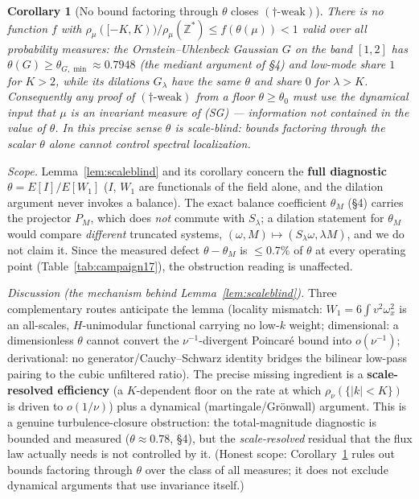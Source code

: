 \documentclass[11pt]{article}
\newtheorem{corollary}[theorem]{Corollary}
\theoremstyle{remark}
\theoremstyle{plain}
\begin{document}
\begin{corollary}[No bound factoring through $\theta$ closes $(\dagger\text{-weak})$]\label{cor:noftheta}
There is no function $f$ with
$\rho_\mu([-K,K))/\rho_\mu(\mathbb{Z}^*) \le f(\theta(\mu)) < 1$ valid over all
probability measures: the Ornstein--Uhlenbeck Gaussian $G$ on the band $[1,2]$ has
$\theta(G) \ge \theta_{G,\min} \approx 0.7948$ (the mediant argument of \S4) and low-mode
share $1$ for $K > 2$, while its dilations $G_\lambda$ have the \emph{same} $\theta$ and
share $0$ for $\lambda > K$. Consequently any proof of $(\dagger\text{-weak})$ from a
floor $\theta \ge \theta_0$ must use the dynamical input that $\mu$ is an
\emph{invariant measure} of (SG) --- information not contained in the value of
$\theta$. In this precise sense $\theta$ is scale-blind: bounds factoring through the
scalar $\theta$ alone cannot control spectral localization.
\end{corollary}

\emph{Scope.} Lemma~\ref{lem:scaleblind} and its corollary concern the \textbf{full
diagnostic} $\theta = E[I]/E[W_1]$ ($I$, $W_1$ are functionals of the field alone,
and the dilation argument never invokes a balance). The exact balance coefficient
$\theta_M$ (\S4) carries the projector $P_M$, which does \emph{not} commute with
$S_\lambda$; a dilation statement for $\theta_M$ would compare \emph{different}
truncated systems, $(\omega, M) \mapsto (S_\lambda\omega, \lambda M)$, and we do not
claim it. Since the measured defect $\theta - \theta_M$ is $\le 0.7\%$ of $\theta$ at
every operating point (Table~\ref{tab:campaign17}), the obstruction reading is
unaffected.

\emph{Discussion (the mechanism behind Lemma~\ref{lem:scaleblind}).} Three complementary
routes anticipate the lemma
(locality mismatch: $W_1=6\int v^2\omega_x^2$ is an all-scales, $H$-unimodular functional
carrying no low-$k$ weight; dimensional: a dimensionless $\theta$ cannot convert the
$\nu^{-1}$-divergent Poincar\'e bound into $o(\nu^{-1})$; derivational: no
generator/Cauchy--Schwarz identity bridges the bilinear low-pass pairing to the
cubic unfiltered ratio). The precise missing ingredient is a
\textbf{scale-resolved efficiency} (a $K$-dependent floor on the rate at which
$\rho_\nu(\{|k|<K\})$ is driven to $o(1/\nu)$) plus a dynamical (martingale/Gr\"onwall)
argument. This is a genuine turbulence-closure obstruction: the total-magnitude
diagnostic is bounded and measured ($\theta \approx 0.78$, \S4), but the \emph{scale-resolved}
residual that the flux law actually needs is not controlled by it. (Honest scope:
Corollary~\ref{cor:noftheta} rules out bounds factoring through $\theta$ over the class
of all measures; it does not exclude dynamical arguments that use invariance itself.)
\end{document}
